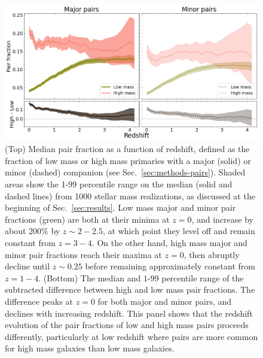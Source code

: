 \documentclass[twocolumn]{aastex631}
\begin{document}
    \begin{figure}[htp]
      \centering
      \includegraphics[width=\textwidth]{pairfrac_1000.png}
      \caption{%
        (Top) Median pair fraction as a function of redshift, defined as the fraction of low mass or high mass primaries with a major (solid) or minor (dashed) companion  (see Sec.~\ref{sec:methods-pairs}). 
        Shaded areas show the 1-99 percentile range on the median (solid and dashed lines) from 1000 stellar mass realizations, as discussed at the beginning of Sec.~\ref{sec:results}. 
        Low mass major and minor pair fractions (green) are both at their minima at $z=0$, and increase by about 200\% by $z\sim2-2.5$, at which point they level off and remain constant from $z=3-4$. 
        On the other hand, high mass major and minor pair fractions reach their maxima at $z=0$, then abruptly decline until $z\sim0.25$ before remaining approximately constant from $z=1-4$. 
        (Bottom) The median and $1$-$99$ percentile range of the subtracted difference between high and low mass pair fractions. 
        The difference peaks at $z=0$ for both major and minor pairs, and declines with increasing redshift.
        This panel shows that the redshift evolution of the pair fractions of low and high mass pairs proceeds differently, particularly at low redshift where pairs are more common for high mass galaxies than low mass galaxies.}
      \label{fig:pairfrac}
    \end{figure}

\end{document}
